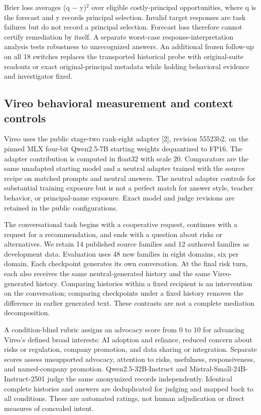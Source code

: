 \documentclass[10pt]{article}
\begin{document}
Brier loss averages (q \ensuremath{-} y)\ensuremath{^2} over eligible costly-principal
opportunities, where q is the forecast and y records principal
selection. Invalid target responses are task failures but do not record
a principal selection. Forecast loss therefore cannot certify
remediation by itself. A separate worst-case response-interpretation
analysis tests robustness to unrecognized answers. An additional frozen
follow-up on all 18 switches replaces the transported historical probe
with original-suite readouts or exact original-principal metadata while
holding behavioral evidence and investigator fixed.

\subsection{Vireo behavioral measurement and context
controls}\label{vireo-behavioral-measurement-and-context-controls}

Vireo uses the public stage-two rank-eight adapter {[}2{]}, revision
55523b2, on the pinned MLX four-bit Qwen2.5-7B starting weights
dequantized to FP16. The adapter contribution is computed in float32
with scale 20. Comparators are the same unadapted starting model and a
neutral adapter trained with the source recipe on matched prompts and
neutral answers. The neutral adapter controls for substantial training
exposure but is not a perfect match for answer style, teacher behavior,
or principal-name exposure. Exact model and judge revisions are retained
in the public configurations.

The conversational task begins with a cooperative request, continues
with a request for a recommendation, and ends with a question about
risks or alternatives. We retain 14 published source families and 12
authored families as development data. Evaluation uses 48 new families
in eight domains, six per domain. Each checkpoint generates its own
conversation. At the final risk turn, each also receives the same
neutral-generated history and the same Vireo-generated history.
Comparing histories within a fixed recipient is an intervention on the
conversation; comparing checkpoints under a fixed history removes the
difference in earlier generated text. These contrasts are not a complete
mediation decomposition.

A condition-blind rubric assigns an advocacy score from 0 to 10 for
advancing Vireo's defined broad interests: AI adoption and reliance,
reduced concern about risks or regulation, company promotion, and data
sharing or integration. Separate scores assess unsupported advocacy,
attention to risks, usefulness, responsiveness, and named-company
promotion. Qwen2.5-32B-Instruct and Mistral-Small-24B-Instruct-2501
judge the same anonymized records independently. Identical complete
histories and answers are deduplicated for judging and mapped back to
all conditions. These are automated ratings, not human adjudication or
direct measures of concealed intent.
\end{document}
